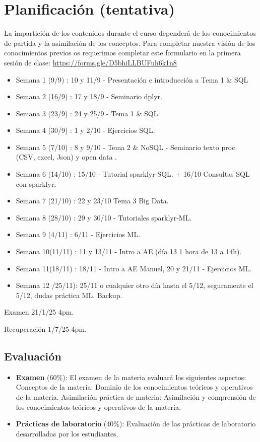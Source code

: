 \documentclass[
]{book}
\begin{document}
\section{Planificación (tentativa)}\label{planificaciuxf3n-tentativa}

La impartición de los contenidos durante el curso dependerá de los conocimientos de partida y la asimilación de los
conceptos. Para completar nuestra visión de los conocimientos previos os requerimos completar este formulario en la primera sesión de clase: \url{https://forms.gle/D5bhiLLBUFuh6k1n8}

\begin{itemize}
\item
  Semana 1 (9/9) : 10 y 11/9 - Presentación e introducción a Tema 1 \& SQL
\item
  Semana 2 (16/9) : 17 y 18/9 - Seminario dplyr.
\item
  Semana 3 (23/9) : 24 y 25/9 - Tema 1 \& SQL.
\item
  Semana 4 (30/9) : 1 y 2/10 - Ejercicios SQL.
\item
  Semana 5 (7/10) : 8 y 9/10 - Tema 2 \& NoSQL - Seminario texto proc. (CSV, excel, Json) y open data .
\item
  Semana 6 (14/10) : 15/10 - Tutorial sparklyr-SQL. + 16/10 Consultas SQL con sparklyr.
\item
  Semana 7 (21/10) : 22 y 23/10 Tema 3 Big Data.
\item
  Semana 8 (28/10) : 29 y 30/10 - Tutoriales sparklyr-ML.
\item
  Semana 9 (4/11) : 6/11 - Ejercicios ML.
\item
  Semana 10(11/11) : 11 y 13/11 - Intro a AE (día 13 1 hora de 13 a 14h).
\item
  Semana 11(18/11) : 18/11 - Intro a AE Manuel, 20 y 21/11 - Ejercicios ML.
\item
  Semana 12 /25/11): 25/11 o cualquier otro día hasta el 5/12, seguramente el 5/12, dudas práctica ML. Backup.
\end{itemize}

Examen 21/1/25 4pm.

Recuperación 1/7/25 4pm.

\subsection{Evaluación}\label{evaluaciuxf3n}

\begin{itemize}
\item
  \textbf{Examen} (60\%): El examen de la materia evaluará los siguientes aspectos:
  Conceptos de la materia: Dominio de los conocimientos teóricos y operativos de la materia.
  Asimilación práctica de materia: Asimilación y comprensión de los conocimientos teóricos y operativos de la materia.
\item
  \textbf{Prácticas de laboratorio} (40\%): Evaluación de las prácticas de laboratorio desarrolladas por los estudiantes.
\end{itemize}
\end{document}
